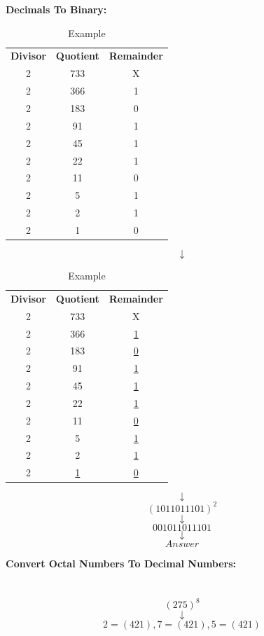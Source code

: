 \documentclass{article}
\begin{document}
\newpage
\textbf{Decimals To Binary:}
\begin{table}[h!]
    \centering
    \begin{tabular}{|c|c|c|}
        \textbf{Divisor} & \textbf{Quotient} & \textbf{Remainder} \\
        2 & 733 & X \\
        2 & 366 & 1 \\
        2 & 183 & 0  \\
        2 & 91 & 1 \\
        2 & 45 & 1 \\
        2 & 22 & 1 \\
        2 & 11 & 0 \\
        2 & 5 & 1 \\
        2 & 2 & 1 \\
        2 & 1 & 0 \\
        
    \end{tabular}
    \caption{Example}
    \label{tab:my_label}
\end{table}
$$\downarrow$$
\begin{table}[h!]
    \centering
    \begin{tabular}{|c|c|c|}
        \textbf{Divisor} & \textbf{Quotient} & \textbf{Remainder} \\
        2 & 733 & X \\
        2 & 366 & \underline{1} \\
        2 & 183 & \underline{0}  \\
        2 & 91 & \underline{1} \\
        2 & 45 & \underline{1} \\
        2 & 22 & \underline{1} \\
        2 & 11 & \underline{0} \\
        2 & 5 & \underline{1} \\
        2 & 2 & \underline{1} \\
        2 & \underline{1} & \underline{0} \\
        
    \end{tabular}
    \caption{Example}
    \label{tab:my_label}
\end{table}
$$\downarrow$$
$$(1011011101)^2$$
$$\downarrow$$
$$001011011101$$
$$\downarrow$$
$$Answer$$

\newpage
\newline
\textbf{Convert Octal Numbers To Decimal Numbers:}
\section*{}
$$(275)^8$$
$$\downarrow$$
$$2=(421), 7=(421), 5=(421)$$
\end{document}
